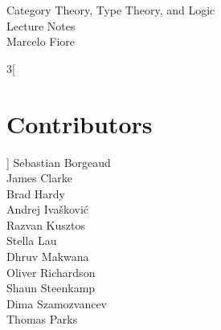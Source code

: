 \setlength\parindent{0pt}
\setlength\parskip{0.7em}

\newcommand {\cat}{%
    \mathbf%
}
\newcommand {\domain}[1] {%
    \mathrm{dom}(#1)%
}
\newcommand {\codomain}[1] {%
    \mathrm{cod}(#1)%
}
\newcommand {\idarrow}[1][] {%
    \mathbf{1}{#1}%
}
\newcommand{\catcat}{\cat {Cat}}
\newcommand{\catmon}{\cat {Mon}}
\newcommand{\catposet}{\cat {Poset}}
\newcommand{\catrel}{\cat {Rel}}
\newcommand{\catset}{\cat {Set}}
\newcommand{\catpfn}{\cat {Pfn}}
\newcommand{\catfinset}{\cat {FinSet}}
\newcommand{\catbij}{\cat {Bij}}
\newcommand{\catgroup}{\cat {Groups}}
\newcommand{\catgraph}{\cat {Graphs}}
\newcommand{\catpreo}{\cat {PreO}}
\newcommand{\catpred}{\cat {Pred}}
\newcommand{\catdirgraph}{\cat {DirGraph}}

\DeclareMathOperator{\Ob}{\mathit{Obj}}
\DeclareMathOperator{\Arr}{\mathit{Arr}}

\newcommand{\ie}{\emph{i.e.}}
\newcommand{\etc}{\emph{etc.}}

\newcommand{\eqdef}{\stackrel{\text{def}}{=}}
\newcommand{\iffdef}{\stackrel{\text{def}}{\iff}}
\newcommand{\comp}{\circ} %
\newcommand{\icomp}{\,} %

\newcommand{\setof}[1]{ \{ #1 \} }
\newcommand{\bigsetof}[1]{ \big\{ #1 \big\} }
\newcommand{\suchthat}{\mid}
\newcommand{\union}{\cup}

\newcommand{\nelem}[1]{ \mathbb{ #1 } }
\newcommand{\id}[1]{ \mathrm{id}_{ #1 } }
\newcommand{\idfunc}{ \mathrm{Id} }
\newcommand{\nats}{\mathbb{N}}
\newcommand{\morpharrow}{\longrightarrow}
\newcommand{\morpharr}[1]{\overset{#1}{\morpharrow}}

\newcommand{\verteq}{\rotatebox{90}{$\,=$}}
\newcommand{\equalto}[2]{\underset{\displaystyle\overset{\mkern4mu\verteq}{#2}}{#1}}
\newcommand{\mapsfrom}{\reflectbox{$\;\mapsto\;$}}



\begin{center} {\LARGE \sc
Category Theory, Type Theory, and Logic\\
  Lecture Notes\\[4mm]}
  \Large Marcelo Fiore
\end{center}


\thispagestyle{plain}
\begin{multicols}{3}[\section*{Contributors}]
Sebastian Borgeaud\\
James Clarke\\
Brad Hardy\\
Andrej Ivašković\\
Razvan Kusztos\\
Stella Lau\\
Dhruv Makwana\\
Oliver Richardson\\
Shaun Steenkamp\\
Dima Szamozvancev\\
Thomas Parks
\end{multicols}
\clearpage


